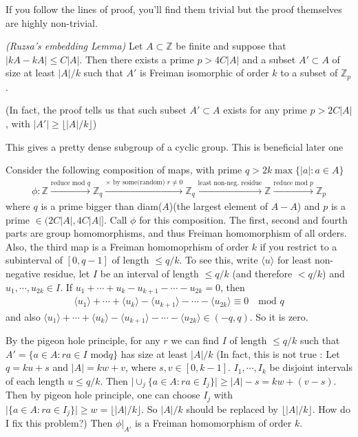 \documentclass[10pt,a4paper]{report}
\newenvironment{proof}
{\begin{changemargin}{1cm}{0.5cm}
	}%
	{\end{changemargin}
}
\begin{document}
If you follow the lines of proof, you'll find them trivial but the proof themselves are highly non-trivial.
\s

 \emph{(Ruzsa's embedding Lemma)} Let $A\subset \mathbb{Z}$ be finite and suppose that $|kA-kA| \leq C|A|$. Then there exists a prime $p > 4C|A|$ and a subset $A'\subset A$ of size at least $|A|/k$ such that $A'$ is Freiman isomorphic of order $k$ to a subset of $\mathbb{Z}_p$.

(In fact, the proof tells us that such subset $A'\subset A$ exists for any prime $p>2C|A|$, with $|A'| \geq \lfloor |A|/k \rfloor$)
\s

This gives a pretty dense subgroup of a cyclic group. This is beneficial later one

\begin{proof}
\pf Consider the following composition of maps, with prime $q > 2k \max \{ |a|:a\in A\}$
\begin{align*}
\phi : \mathbb{Z} \xrightarrow{\text{reduce mod } q} \mathbb{Z}_q \xrightarrow{\times \text{ by some(random) }r\neq 0} \mathbb{Z}_q \xrightarrow{\text{least non-neg. residue}} \mathbb{Z} \xrightarrow{\text{reduce mod } p} \mathbb{Z}_p
\end{align*}
where $q$ is a prime bigger than diam($A$)(the largest element of $A-A$) and $p$ is a prime $\in (2C|A|,4C|A|]$. Call $\phi$ for this composition. The first, second and fourth parts are group homomorphisms, and thus Freiman homomorphism of all orders. Also, the third map is a Freiman homomoprhism of order $k$ if you restrict to a subinterval of $[0,q-1]$ of length $\leq q/k$. To see this, write $\langle u\rangle$ for least non-negative residue, let $I$ be an interval of length $\leq q/k$ (and therefore $<q/k$) and $u_1, \cdots, u_{2k} \in I$. If $u_1 + \cdots +u_k - u_{k+1} - \cdots -u_{2k} =0$, then
\begin{align*}
\langle u_1 \rangle + \cdots + \langle u_k \rangle - \langle u_{k+1} \rangle - \cdots - \langle u_{2k} \rangle \equiv 0 \quad \text{mod } q
\end{align*}
and also $\langle u_1 \rangle + \cdots + \langle u_k \rangle - \langle u_{k+1} \rangle - \cdots - \langle u_{2k} \rangle \in (-q,q)$. So it is zero.

\quad By the pigeon hole principle, for any $r$ we can find $I$ of length $\leq q/k$ such that $A' = \{ a\in A : ra\in I \text{ mod} q\}$ has size at least $|A|/k$ (In fact, this is not true : Let $q = ku + s$ and $|A| = kw + v$, where $s,v\in [0,k-1]$. $I_1,\cdots,I_k$ be disjoint intervals of each length $u \leq q/k$. Then $\big| \cup_j \{a\in A : ra \in I_j \} \big| \geq |A| -s = kw+(v-s)$. Then by pigeon hole principle, one can choose $I_j$ with $\Big| \{a\in A : ra \in I_j \} \Big| \geq w = \lfloor |A|/k \rfloor$. So $|A|/k$ should be replaced by $\lfloor |A|/k \rfloor$.  How do I fix this problem?) Then $\phi|_{A'}$ is a Freiman homomorphism of order $k$.
\s


\end{proof}
\end{document}
